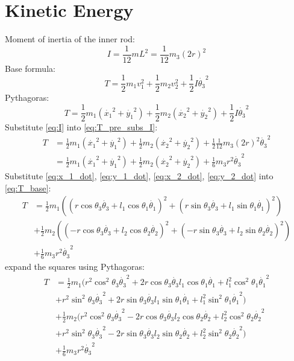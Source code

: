 \documentclass[titlepage]{article}
\numberwithin{equation}{section}
\begin{document}
\section{Kinetic Energy}
Moment of inertia of the inner rod:
\begin{equation} \label{eq:I}
I = \frac{1}{12} m L^2 = \frac{1}{12} m_3 (2 r)^2
\end{equation}
Base formula:
\begin{equation}
T = \frac{1}{2} m_1 v_1^2 + \frac{1}{2} m_2 v_2^2 + \frac{1}{2} I \dot{\theta_3}^2
\end{equation}
Pythagoras:
\begin{equation} \label{eq:T_pre_subs_I}
T = \frac{1}{2} m_1 (\dot{x_1}^2 + \dot{y_1}^2) + \frac{1}{2} m_2 (\dot{x_2}^2 + \dot{y_2}^2) + \frac{1}{2} I \dot{\theta_3}^2
\end{equation}
Substitute \ref{eq:I} into \ref{eq:T_pre_subs_I}:
\begin{align}
T &= \frac{1}{2} m_1 (\dot{x_1}^2 + \dot{y_1}^2) + \frac{1}{2} m_2 (\dot{x_2}^2 + \dot{y_2}^2) + \frac{1}{2} \frac{1}{12} m_3 (2 r)^2 \dot{\theta_3}^2 \nonumber \\
&= \frac{1}{2} m_1 (\dot{x_1}^2 + \dot{y_1}^2) + \frac{1}{2} m_2 (\dot{x_2}^2 + \dot{y_2}^2) + \frac{1}{6} m_3 r^2 \dot{\theta_3}^2 \label{eq:T_base}
\end{align}
Substitute \ref{eq:x_1_dot}, \ref{eq:y_1_dot}, \ref{eq:x_2_dot}, \ref{eq:y_2_dot} into \ref{eq:T_base}:
\begin{align}
T &= \frac{1}{2} m_1 ((r \cos \theta_3 \dot{\theta_3} + l_1 \cos \theta_1 \dot{\theta_1})^2 + (r \sin \theta_3 \dot{\theta_3} + l_1 \sin \theta_1 \dot{\theta_1})^2) \nonumber \\
  &+ \frac{1}{2} m_2 ((-r \cos \theta_3 \dot{\theta_3} + l_2 \cos \theta_2 \dot{\theta_2})^2 + (-r \sin \theta_3 \dot{\theta_3} + l_2 \sin \theta_2 \dot{\theta_2})^2) \nonumber \\
  &+ \frac{1}{6} m_3 r^2 \dot{\theta_3}^2
\end{align}
expand the squares using Pythagoras:
\begin{align}
T &= \frac{1}{2} m_1 (r^2 \cos^2 \theta_3 \dot{\theta_3}^2 + 2 r \cos \theta_3 \dot{\theta_3} l_1 \cos \theta_1 \dot{\theta_1} + l_1^2 \cos^2 \theta_1 \dot{\theta_1}^2 \nonumber \\
  &+ r^2 \sin^2 \theta_3 \dot{\theta_3}^2 + 2 r \sin \theta_3 \dot{\theta_3} l_1 \sin \theta_1 \dot{\theta_1} + l_1^2 \sin^2 \theta_1 \dot{\theta_1}^2) \nonumber \\
  &+ \frac{1}{2} m_2 (r^2 \cos^2 \theta_3 \dot{\theta_3}^2 - 2 r \cos \theta_3 \dot{\theta_3} l_2 \cos \theta_2 \dot{\theta_2} + l_2^2 \cos^2 \theta_2 \dot{\theta_2}^2 \nonumber \\
  &+ r^2 \sin^2 \theta_3 \dot{\theta_3}^2 - 2 r \sin \theta_3 \dot{\theta_3} l_2 \sin \theta_2 \dot{\theta_2} + l_2^2 \sin^2 \theta_2 \dot{\theta_2}^2) \nonumber \\
  &+ \frac{1}{6} m_3 r^2 \dot{\theta_3}^2
\end{align}
\end{document}
